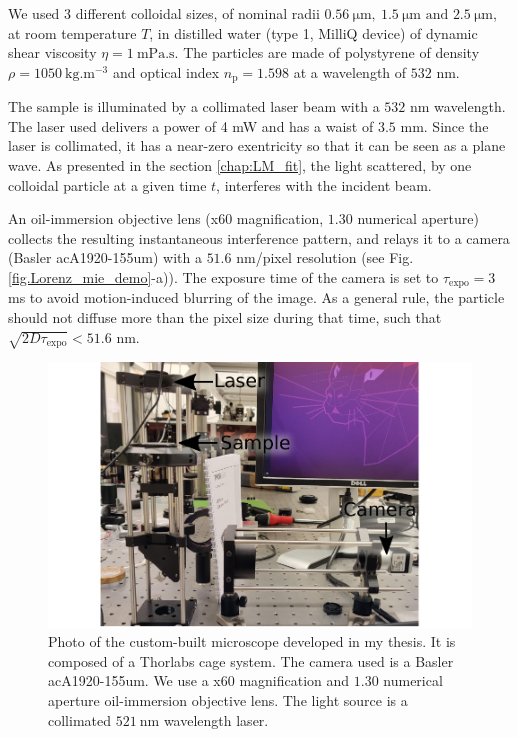 We used 3 different colloidal sizes, of nominal radii $0.56 ~ \mathrm{\mu m}, ~ 1.5 ~ \mathrm{\mu m} \text{ and } 2.5 ~ \mathrm{\mu m} $, at room temperature $T$, in distilled water (type 1, MilliQ device) of dynamic shear viscosity $\eta = 1 ~ \mathrm{mPa.s}$. The particles are made of polystyrene of density $\rho = 1050  ~\mathrm{kg.m^{-3}}$ and optical index $n_\mathrm{p} = 1.598$ at a wavelength of $532$ nm.

The sample is illuminated by a collimated laser beam with a $532$ nm wavelength. The laser used delivers a power of 4 mW and has a waist of $3.5$ mm. Since the laser is collimated, it has a near-zero exentricity so that it can be seen as a plane wave. As presented in the section \ref{chap:LM_fit}, the light scattered, by one colloidal particle at a given time $t$, interferes with the incident beam. 

An oil-immersion objective lens (x60 magnification, $1.30$ numerical aperture) collects the resulting instantaneous interference pattern, and relays it to a camera (Basler acA1920-155um) with a $51.6$ nm/pixel resolution (see Fig.\ref{fig.Lorenz_mie_demo}-a)). The exposure time of the camera is set to $\tau_{\mathrm{expo}} = 3$ ms to avoid motion-induced blurring of the image. As a general rule, the particle should not diffuse more than the pixel size during that time, such that $\sqrt{2D\tau_{\mathrm{expo}} }< 51.6$ nm.

\begin{figure}[!ht]
	\centering
	\includegraphics{02_body/chapter2/images/figures_setup/photo_setup.pdf}
	\caption{Photo of the custom-built microscope developed in my thesis. It is composed of a Thorlabs cage system. The camera used is a Basler acA1920-155um. We use a x60 magnification and $1.30$ numerical aperture oil-immersion objective lens. The light source is a collimated  $521 ~ \mathrm{n m}$ wavelength laser.}
	\label{fig:picture}
\end{figure}

